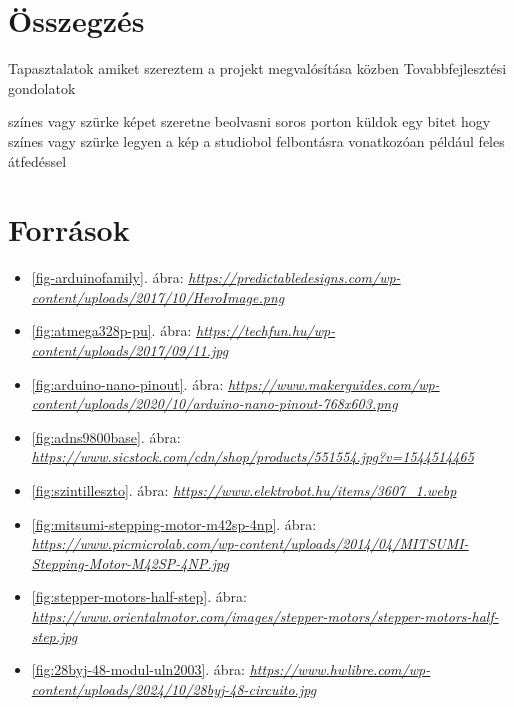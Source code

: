 \documentclass[]{thesis-ekf}
\theoremstyle{definition}
\theoremstyle{remark}
\begin{document}
\chapter*{Összegzés}
Tapasztalatok amiket szereztem a projekt megvalósítása közben
Tovabbfejlesztési gondolatok

színes vagy szürke képet szeretne beolvasni
soros porton küldok egy bitet hogy színes vagy szürke legyen a kép a studiobol
felbontásra vonatkozóan például  feles átfedéssel 
\chapter*{Források}
\begin{itemize}
	\item \ref{fig-arduinofamily}. ábra: \emph{\url{https://predictabledesigns.com/wp-content/uploads/2017/10/HeroImage.png}}
	\item \ref{fig:atmega328p-pu}. ábra: \emph{\url{https://techfun.hu/wp-content/uploads/2017/09/11.jpg}}
	\item \ref{fig:arduino-nano-pinout}. ábra: \emph{\url{https://www.makerguides.com/wp-content/uploads/2020/10/arduino-nano-pinout-768x603.png}}
	\item \ref{fig:adns9800base}. ábra: \emph{\url{https://www.sicstock.com/cdn/shop/products/551554.jpg?v=1544514465}}
	\item \ref{fig:szintilleszto}. ábra: \emph{\url{https://www.elektrobot.hu/items/3607_1.webp}}
	\item \ref{fig:mitsumi-stepping-motor-m42sp-4np}. ábra: \emph{\url{https://www.picmicrolab.com/wp-content/uploads/2014/04/MITSUMI-Stepping-Motor-M42SP-4NP.jpg}}
	\item \ref{fig:stepper-motors-half-step}. ábra: \emph{\url{https://www.orientalmotor.com/images/stepper-motors/stepper-motors-half-step.jpg}}
	\item \ref{fig:28byj-48-modul-uln2003}. ábra: \emph{\url{https://www.hwlibre.com/wp-content/uploads/2024/10/28byj-48-circuito.jpg}}
\end{itemize}
\end{document}
